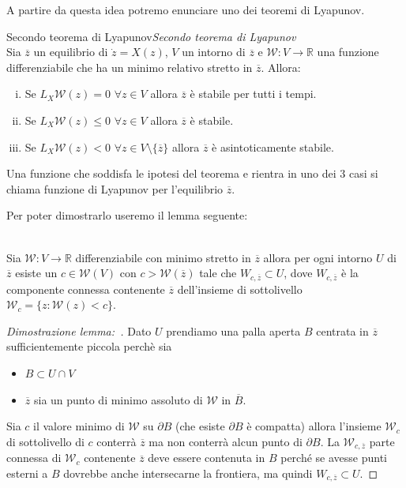\documentclass[11pt,a4paper,twoside]{book}
\newenvironment{proposizione}[1][\empty]{\begin{Proposizione}{
\ifx\empty#1\relax\else\mdseries\itshape#1\\\fi
}{}}{\end{Proposizione}}
\newenvironment{lemma}[1][\empty]{\begin{Lemma}{
\ifx\empty#1\relax\else\mdseries\itshape#1\\\fi
}{}}{\end{Lemma}}
\newenvironment{dimo}[1][\proofname]{
	\begin{tcolorbox}[
	breakable, 
	enhanced, 
	interior hidden, 
	frame hidden, 
	borderline west = {1pt}{0pt}{gray}, 
	top=0pt, bottom=0pt, left=0pt]
\begin{proof}[#1:~]
}
{
\end{proof}
\end{tcolorbox}
}
\theoremstyle{esss}
\theoremstyle{dotless}
\numberwithin{equation}{section} %
\begin{document}
A partire da questa idea potremo enunciare uno dei teoremi di Lyapunov.

\begin{proposizione}[Secondo teorema di Lyapunov]\label{secondoTeoLyapunov}
Sia $\overline{z}$ un equilibrio di $\dot{z}=X(z)$, $V$ un intorno di $\overline{z}$ e $\mathcal{W}:V\rightarrow\mathbb{R}$ una funzione differenziabile che ha un minimo relativo stretto in $\overline{z}$. Allora: 
\begin{enumerate}[i.]
\item Se $L_X\mathcal{W}(z)=0$ $\forall z\in V$ allora $\overline{z}$ è stabile per tutti i tempi.
\item Se $L_X\mathcal{W}(z)\leq 0$ $\forall z\in V$ allora $\overline{z}$ è stabile.
\item Se $L_X\mathcal{W}(z)<0$ $\forall z\in V\setminus\{\overline{z}\}$ allora $\overline{z}$ è asintoticamente stabile. 
\end{enumerate}
Una funzione che soddisfa le ipotesi del teorema e  rientra in uno dei $3$ casi si chiama funzione di Lyapunov per l'equilibrio $\overline{z}$.
\end{proposizione}

Per poter dimostrarlo useremo il lemma seguente:

\begin{lemma}\label{lemmaSecondoTeoLyapunov}
Sia $\mathcal{W}:V\rightarrow\mathbb{R}$ differenziabile con minimo stretto in $\overline{z}$ allora per ogni intorno $U$ di $\overline{z}$ esiste un $c\in\mathcal{W}(V)$ con $c>\mathcal{W}(\overline{z})$ tale che $W_{c,\overline{z}}\subset U$, dove $W_{c,\overline{z}}$ è la componente connessa contenente $\overline{z}$ dell'insieme di sottolivello $\mathcal{W}_c=\{z:\mathcal{W}(z)<c\}$.
\end{lemma}
\begin{dimo}[Dimostrazione lemma]
Dato $U$ prendiamo una palla aperta $B$ centrata in $\overline{z}$ sufficientemente piccola perchè sia\begin{itemize}
\item $B\subset U\cap V$
\item $\overline{z}$ sia un punto di minimo assoluto di $\mathcal{W}$ in $\overline{B}$.
\end{itemize}
Sia $c$ il valore minimo di $\mathcal{W}$ su $\partial B$ (che esiste  $\partial B$ è compatta) allora l'insieme $\mathcal{W}_c$ di sottolivello di $c$ conterrà $\overline{z}$ ma non conterrà alcun punto di $\partial B$.
La $\mathcal{W}_{c,\overline{z}}$ parte connessa di $\mathcal{W}_c$ contenente $\overline{z}$ deve essere contenuta in $B$ perché se avesse punti esterni a $B$ dovrebbe anche intersecarne la frontiera, ma quindi $W_{c,\overline{z}}\subset U$. \qedhere
\end{dimo}
\end{document}
